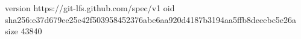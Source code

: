 version https://git-lfs.github.com/spec/v1
oid sha256:e37d679ee25e42f503958452376abe6aa920d4187b3194aa5ffb8deeebc5e26a
size 43840
